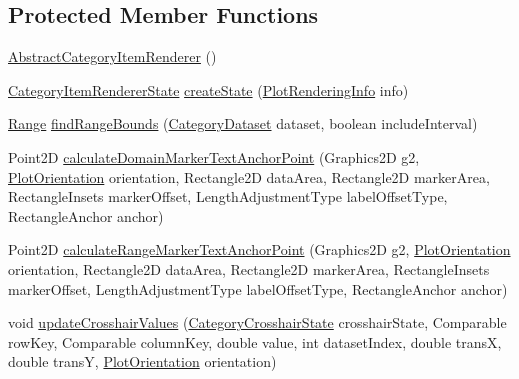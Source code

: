 \subsection*{Protected Member Functions}
\begin{DoxyCompactItemize}
\item 
\mbox{\hyperlink{classorg_1_1jfree_1_1chart_1_1renderer_1_1category_1_1_abstract_category_item_renderer_a78fcaeb3d2a823c5b045387e511a22b9}{Abstract\+Category\+Item\+Renderer}} ()
\item 
\mbox{\hyperlink{classorg_1_1jfree_1_1chart_1_1renderer_1_1category_1_1_category_item_renderer_state}{Category\+Item\+Renderer\+State}} \mbox{\hyperlink{classorg_1_1jfree_1_1chart_1_1renderer_1_1category_1_1_abstract_category_item_renderer_af6ad3482f91eae74b4ab24de4d9e7151}{create\+State}} (\mbox{\hyperlink{classorg_1_1jfree_1_1chart_1_1plot_1_1_plot_rendering_info}{Plot\+Rendering\+Info}} info)
\item 
\mbox{\hyperlink{classorg_1_1jfree_1_1data_1_1_range}{Range}} \mbox{\hyperlink{classorg_1_1jfree_1_1chart_1_1renderer_1_1category_1_1_abstract_category_item_renderer_af2965aa1633da598d5bd8e742f207aaf}{find\+Range\+Bounds}} (\mbox{\hyperlink{interfaceorg_1_1jfree_1_1data_1_1category_1_1_category_dataset}{Category\+Dataset}} dataset, boolean include\+Interval)
\item 
Point2D \mbox{\hyperlink{classorg_1_1jfree_1_1chart_1_1renderer_1_1category_1_1_abstract_category_item_renderer_a2eea9fbf439f92670462ef46d59a466e}{calculate\+Domain\+Marker\+Text\+Anchor\+Point}} (Graphics2D g2, \mbox{\hyperlink{classorg_1_1jfree_1_1chart_1_1plot_1_1_plot_orientation}{Plot\+Orientation}} orientation, Rectangle2D data\+Area, Rectangle2D marker\+Area, Rectangle\+Insets marker\+Offset, Length\+Adjustment\+Type label\+Offset\+Type, Rectangle\+Anchor anchor)
\item 
Point2D \mbox{\hyperlink{classorg_1_1jfree_1_1chart_1_1renderer_1_1category_1_1_abstract_category_item_renderer_a5fa153dd07f2fb8ea218aae528b7cecd}{calculate\+Range\+Marker\+Text\+Anchor\+Point}} (Graphics2D g2, \mbox{\hyperlink{classorg_1_1jfree_1_1chart_1_1plot_1_1_plot_orientation}{Plot\+Orientation}} orientation, Rectangle2D data\+Area, Rectangle2D marker\+Area, Rectangle\+Insets marker\+Offset, Length\+Adjustment\+Type label\+Offset\+Type, Rectangle\+Anchor anchor)
\item 
void \mbox{\hyperlink{classorg_1_1jfree_1_1chart_1_1renderer_1_1category_1_1_abstract_category_item_renderer_aebbd1047a1a17ed75cee062c13a88c9c}{update\+Crosshair\+Values}} (\mbox{\hyperlink{classorg_1_1jfree_1_1chart_1_1plot_1_1_category_crosshair_state}{Category\+Crosshair\+State}} crosshair\+State, Comparable row\+Key, Comparable column\+Key, double value, int dataset\+Index, double transX, double transY, \mbox{\hyperlink{classorg_1_1jfree_1_1chart_1_1plot_1_1_plot_orientation}{Plot\+Orientation}} orientation)

\end{DoxyCompactItemize}
